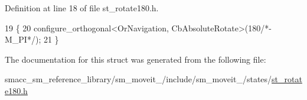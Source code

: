 Definition at line 18 of file st\+\_\+rotate180.\+h.


\begin{DoxyCode}
19     \{
20         configure\_orthogonal<OrNavigation, CbAbsoluteRotate>(180\textcolor{comment}{/*-M\_PI*/});
21     \}
\end{DoxyCode}


The documentation for this struct was generated from the following file\+:\begin{DoxyCompactItemize}
\item 
smacc\+\_\+sm\+\_\+reference\+\_\+library/sm\+\_\+moveit\+\_/include/sm\+\_\+moveit\+\_/states/\hyperlink{3_2include_2sm__moveit__3_2states_2st__rotate180_8h}{st\+\_\+rotate180.\+h}\end{DoxyCompactItemize}
